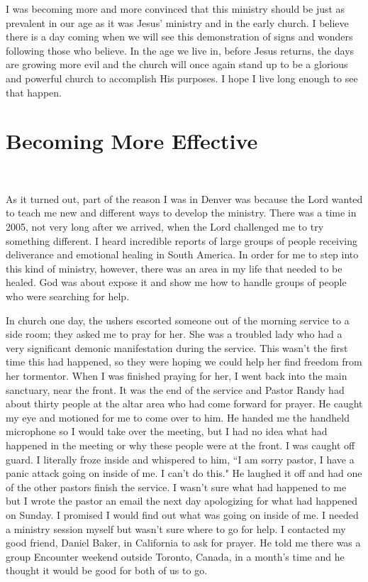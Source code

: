 \documentclass[oneside]{book}
\begin{document}
I was becoming more and more convinced that this ministry should be just as prevalent in our age as it was Jesus' ministry and in the early church. I believe there is a day coming when we will see this demonstration of signs and wonders following those who believe. In the age we live in, before Jesus returns, the days are growing more evil and the church will once again stand up to be a glorious and powerful church to accomplish His purposes. I hope I live long enough to see that happen. 


\chapter{Becoming More Effective}
\

As it turned out, part of the reason I was in Denver was because the Lord wanted to teach me new and different ways to develop the ministry. There was a time in 2005, not very long after we arrived, when the Lord challenged me to try something different. I heard incredible reports of large groups of people receiving deliverance and emotional healing in South America. In order for me to step into this kind of ministry, however, there was an area in my life that needed to be healed. God was about expose it and show me how to handle groups of people who were searching for help.

In church one day, the ushers escorted someone out of the morning service to a side room; they asked me to pray for her. She was a troubled lady who had a very significant demonic manifestation during the service. This wasn't the first time this had happened, so they were hoping we could help her find freedom from her tormentor. When I was finished praying for her, I went back into the main sanctuary, near the front. It was the end of the service and Pastor Randy had about thirty people at the altar area who had come forward for prayer. He caught my eye and motioned for me to come over to him. He handed me the handheld microphone so I would take over the meeting, but I had no idea what had happened in the meeting or why these people were at the front. I was caught off guard. I literally froze inside and whispered to him, ``I am sorry pastor, I have a panic attack going on inside of me. I can't do this." He laughed it off and had one of the other pastors finish the service. I wasn't sure what had happened to me but I wrote the pastor an email the next day apologizing for what had happened on Sunday. I promised I would find out what was going on inside of me. I needed a ministry session myself but wasn't sure where to go for help. I contacted my good friend, Daniel Baker, in California to ask for prayer. He told me there was a group Encounter weekend outside Toronto, Canada, in a month's time and he thought it would be good for both of us to go. 
\end{document}
